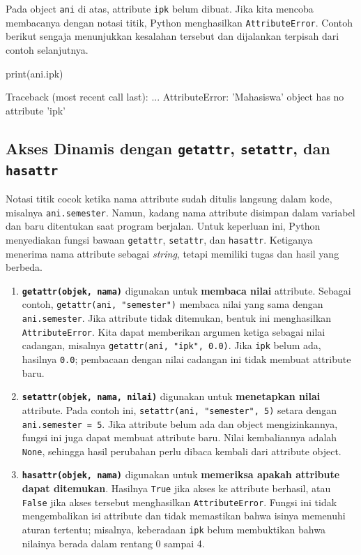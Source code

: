 Pada object \texttt{ani} di atas, attribute \texttt{ipk} belum dibuat. Jika kita mencoba membacanya dengan notasi titik, Python menghasilkan \texttt{AttributeError}. Contoh berikut sengaja menunjukkan kesalahan tersebut dan dijalankan terpisah dari contoh selanjutnya.

\begin{kode}[AttributeError]
print(ani.ipk)
\end{kode}

\begin{keluaran}
Traceback (most recent call last):
  ...
AttributeError: 'Mahasiswa' object has no attribute 'ipk'
\end{keluaran}

\subsection{Akses Dinamis dengan \texttt{getattr}, \texttt{setattr}, dan \texttt{hasattr}}

Notasi titik cocok ketika nama attribute sudah ditulis langsung dalam kode, misalnya \texttt{ani.semester}. Namun, kadang nama attribute disimpan dalam variabel dan baru ditentukan saat program berjalan. Untuk keperluan ini, Python menyediakan fungsi bawaan \texttt{getattr}, \texttt{setattr}, dan \texttt{hasattr}. Ketiganya menerima nama attribute sebagai \emph{string}, tetapi memiliki tugas dan hasil yang berbeda.

\begin{enumerate}
  \item \textbf{\texttt{getattr(objek, nama)}} digunakan untuk \textbf{membaca nilai} attribute. Sebagai contoh, \texttt{getattr(ani, "semester")} membaca nilai yang sama dengan \texttt{ani.semester}. Jika attribute tidak ditemukan, bentuk ini menghasilkan \texttt{AttributeError}. Kita dapat memberikan argumen ketiga sebagai nilai cadangan, misalnya \texttt{getattr(ani, "ipk", 0.0)}. Jika \texttt{ipk} belum ada, hasilnya \texttt{0.0}; pembacaan dengan nilai cadangan ini tidak membuat attribute baru.
  \item \textbf{\texttt{setattr(objek, nama, nilai)}} digunakan untuk \textbf{menetapkan nilai} attribute. Pada contoh ini, \texttt{setattr(ani, "semester", 5)} setara dengan \texttt{ani.semester = 5}. Jika attribute belum ada dan object mengizinkannya, fungsi ini juga dapat membuat attribute baru. Nilai kembaliannya adalah \texttt{None}, sehingga hasil perubahan perlu dibaca kembali dari attribute object.
  \item \textbf{\texttt{hasattr(objek, nama)}} digunakan untuk \textbf{memeriksa apakah attribute dapat ditemukan}. Hasilnya \texttt{True} jika akses ke attribute berhasil, atau \texttt{False} jika akses tersebut menghasilkan \texttt{AttributeError}. Fungsi ini tidak mengembalikan isi attribute dan tidak memastikan bahwa isinya memenuhi aturan tertentu; misalnya, keberadaan \texttt{ipk} belum membuktikan bahwa nilainya berada dalam rentang 0 sampai 4.
\end{enumerate}

